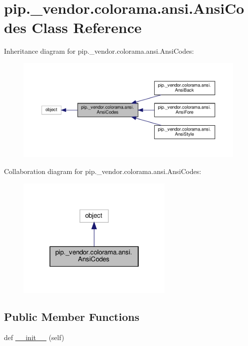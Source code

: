 \hypertarget{classpip_1_1__vendor_1_1colorama_1_1ansi_1_1AnsiCodes}{}\section{pip.\+\_\+vendor.\+colorama.\+ansi.\+Ansi\+Codes Class Reference}
\label{classpip_1_1__vendor_1_1colorama_1_1ansi_1_1AnsiCodes}


Inheritance diagram for pip.\+\_\+vendor.\+colorama.\+ansi.\+Ansi\+Codes\+:
\nopagebreak
\begin{figure}[H]
\begin{center}
\leavevmode
\includegraphics[width=350pt]{classpip_1_1__vendor_1_1colorama_1_1ansi_1_1AnsiCodes__inherit__graph}
\end{center}
\end{figure}


Collaboration diagram for pip.\+\_\+vendor.\+colorama.\+ansi.\+Ansi\+Codes\+:
\nopagebreak
\begin{figure}[H]
\begin{center}
\leavevmode
\includegraphics[width=214pt]{classpip_1_1__vendor_1_1colorama_1_1ansi_1_1AnsiCodes__coll__graph}
\end{center}
\end{figure}
\subsection*{Public Member Functions}
\begin{DoxyCompactItemize}
\item 
def \hyperlink{classpip_1_1__vendor_1_1colorama_1_1ansi_1_1AnsiCodes_a320fa4a146d8be484cb1c5e6c19ffffa}{\+\_\+\+\_\+init\+\_\+\+\_\+} (self)
\end{DoxyCompactItemize}


